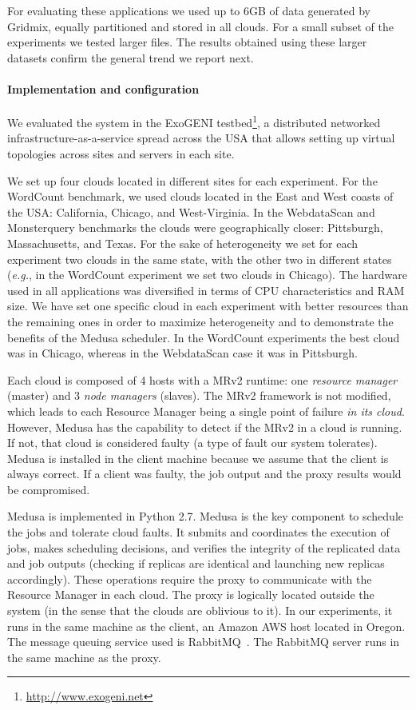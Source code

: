 \documentclass[10pt, conference, compsocconf]{IEEEtran}
\begin{document}
For evaluating these applications we used up to 6GB of data generated by Gridmix, equally partitioned and stored in all clouds.
For a small subset of the experiments we tested larger files.
The results obtained using these larger datasets confirm the general trend we report next.

\paragraph{Implementation and configuration}
We evaluated the system in the ExoGENI testbed\footnote{\url{http://www.exogeni.net}}, a distributed networked infrastructure-as-a-service spread across the USA that allows setting up virtual topologies across sites and servers in each site.

We set up four clouds located in different sites for each experiment.
For the WordCount benchmark, we used clouds  located in the East and West coasts of the USA: California, Chicago, and West-Virginia.
In the WebdataScan and Monsterquery benchmarks the clouds were geographically closer: Pittsburgh, Massachusetts, and Texas.
For the sake of heterogeneity we set for each experiment two clouds in the same state, with the other two in different states (\textit{e.g.}, in the WordCount experiment we set two clouds in Chicago).
The hardware used in all applications was diversified in terms of CPU characteristics and RAM size.
We have set one specific cloud in each experiment with better resources than the remaining ones in order to maximize heterogeneity and to demonstrate the benefits of the Medusa scheduler.
In the WordCount experiments the best cloud was in Chicago, whereas in the WebdataScan case it was in Pittsburgh.

Each cloud is composed of 4 hosts with a MRv2 runtime: one \emph{resource manager} (master) and 3 \emph{node managers}  (slaves).
The MRv2 framework is not modified, which leads to each Resource Manager being a single point of failure \emph{in its cloud}.
However, Medusa has the capability to detect if the MRv2 in a cloud is running.
If not, that cloud is considered faulty (a type of fault our system tolerates).
Medusa is installed in the client machine because we assume that the client is always correct. If a client was faulty, the job output and the proxy results would be compromised.



Medusa is implemented in Python 2.7. Medusa is the key component to schedule the jobs and tolerate cloud faults. It submits and coordinates the execution of jobs, makes scheduling decisions, and verifies the integrity of the replicated data and job outputs (checking if  replicas are identical and launching new replicas accordingly).
These operations require the proxy to communicate with the Resource Manager in each cloud. The proxy is logically located outside the system (in the sense that the clouds are oblivious to it). In our experiments, it  runs in the same machine as the client, an Amazon AWS host located in Oregon.
The message queuing service used is RabbitMQ~\cite{videla2012rabbitmq}. The RabbitMQ server runs in the same machine as the proxy.
\end{document}
